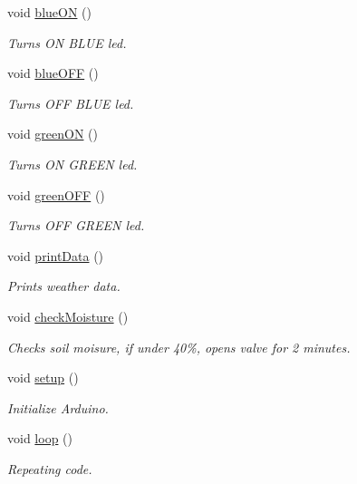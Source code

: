 \begin{DoxyCompactItemize}
void \hyperlink{group__fn_ga04998af0bfe99c448390ce61f68e10aa}{blue\+ON} ()
\begin{DoxyCompactList}\small\item\em Turns ON B\+L\+UE led. \end{DoxyCompactList}\item 
void \hyperlink{group__fn_gadaf50e66c08aabcc0fe574c3815d382d}{blue\+O\+FF} ()
\begin{DoxyCompactList}\small\item\em Turns O\+FF B\+L\+UE led. \end{DoxyCompactList}\item 
void \hyperlink{group__fn_ga7145f6eb0ee4f9c64cd130b5092b28ce}{green\+ON} ()
\begin{DoxyCompactList}\small\item\em Turns ON G\+R\+E\+EN led. \end{DoxyCompactList}\item 
void \hyperlink{group__fn_ga1cb0a5ea076eb54f559513f85b9d0ac7}{green\+O\+FF} ()
\begin{DoxyCompactList}\small\item\em Turns O\+FF G\+R\+E\+EN led. \end{DoxyCompactList}\item 
void \hyperlink{group__fn_ga8990c590daf1e654be6a544107bed3a1}{print\+Data} ()
\begin{DoxyCompactList}\small\item\em Prints weather data. \end{DoxyCompactList}\item 
void \hyperlink{group__fn_ga81f4a232058fafad13d2ab368b8db7db}{check\+Moisture} ()
\begin{DoxyCompactList}\small\item\em Checks soil moisure, if under 40\%, opens valve for 2 minutes. \end{DoxyCompactList}\item 
void \hyperlink{group__base__fn_ga4fc01d736fe50cf5b977f755b675f11d}{setup} ()
\begin{DoxyCompactList}\small\item\em Initialize Arduino. \end{DoxyCompactList}\item 
void \hyperlink{group__base__fn_gafe461d27b9c48d5921c00d521181f12f}{loop} ()
\begin{DoxyCompactList}\small\item\em Repeating code. \end{DoxyCompactList}\end{DoxyCompactItemize}
